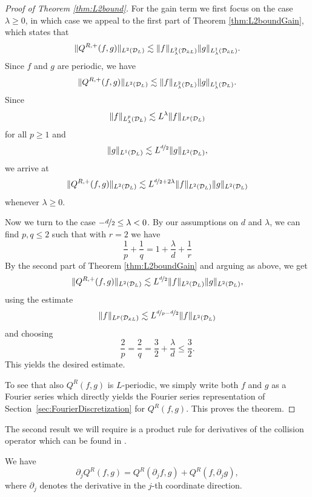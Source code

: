 \begin{proof}[Proof of Theorem \ref{thm:L2bound}]
    For the gain term we first focus on the case $\lambda \geq 0$, in which
    case we appeal to the first part of Theorem \ref{thm:L2boundGain}, which
    states that
    \begin{equation}\label{eq:l2rest0}
        \|Q^{R,+}(f,g)\|_{{L^2(\mathcal{D}_L)}} \lesssim
                \|f\|_{L^2_\lambda(\mathcal{D}_{\tilde{\kappa}L})}\|g\|_{L^1_\lambda(\mathcal{D}_{\tilde{\kappa}L})}.
    \end{equation}
    Since $f$ and $g$ are periodic, we have
    \begin{equation}\label{eq:l2rest1}
        \|Q^{R,+}(f,g)\|_{{L^2(\mathcal{D}_L)}} \lesssim
                \|f\|_{L^2_\lambda(\mathcal{D}_L)}\|g\|_{L^1_\lambda(\mathcal{D}_L)}.
    \end{equation}
    Since 
    \[
        \|f\|_{L^p_\lambda(\mathcal{D}_L)}\lesssim L^\lambda\|f\|_{L^p(\mathcal{D}_L)}
    \]
    for all $p\geq 1$ and 
    \[
        \|g\|_{L^1(\mathcal{D}_L)}\lesssim L^{\nicefrac{d}{2}} \|g\|_{L^2(\mathcal{D}_L)},
    \]
    we arrive at
    \[
        \|Q^{R,+}(f,g)\|_{L^2(\mathcal{D}_L)} \lesssim L^{\nicefrac{d}{2}+2\lambda}
                \|f\|_{L^2(\mathcal{D}_L)}\|g\|_{L^2(\mathcal{D}_L)}
    \]
    whenever $\lambda \geq 0$.
    
    Now we turn to the case $-\nicefrac{d}{2} \le \lambda <0$.  By our assumptions on $d$
    and $\lambda$, we can find $p,q \le 2$ such that with $r=2$ we have
    \[
        \frac{1}{p} + \frac{1}{q} = 1 + \frac{\lambda}{d}+\frac{1}{r}
    \]
    By the second part of Theorem \ref{thm:L2boundGain} and arguing as above,
    we get
    \[
        \|Q^{R,+}(f,g)\|_{L^2(\mathcal{D}_L)} \lesssim L^{\nicefrac{d}{2}}
                \|f\|_{L^2(\mathcal{D}_L)}\|g\|_{L^2(\mathcal{D}_L)},
    \]
    using the estimate
    \[
        \|f\|_{L^p(\mathcal{D}_{\tilde{\kappa}L})} \lesssim L^{\nicefrac{d}{p}-\nicefrac{d}{2}} 
                \|f\|_{L^2(\mathcal{D}_L)}
    \]
    and choosing
    \[
        \frac{2}{p}=\frac{2}{q}=\frac{3}{2}+\frac{\lambda}{d} \le \frac{3}{2}.
    \]
    This yields the desired estimate.
    
    To see that also $Q^R(f,g)$ is $L$-periodic, we simply write both $f$ and
    $g$ as a Fourier series which directly yields the Fourier series
    representation of Section~\ref{sec:FourierDiscretization} for $Q^R(f,g)$.
    This proves the theorem.
\end{proof}
The second result we will require is a product rule for derivatives
of the collision operator which can be found in \cite{Villani1998fie}.
\begin{proposition}\label{prop:prodrule}
    We have 
    \[
        \partial_j Q^R(f,g) = Q^R(\partial_j f, g) + Q^R(f,\partial_j g),
    \]
    where $\partial_j$ denotes the derivative in the $j$-th coordinate
    direction.
\end{proposition}
